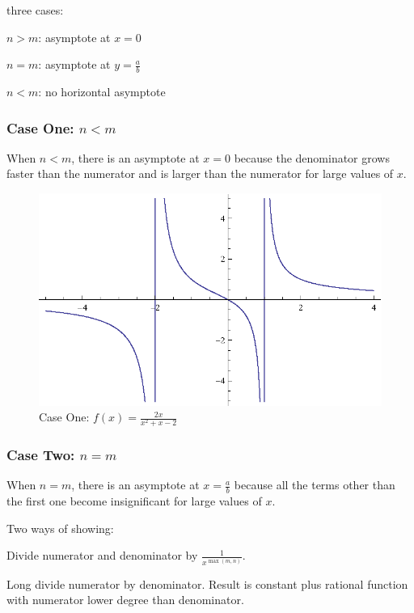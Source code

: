 \documentclass{exam}
\begin{document}
  three cases:
  \begin{enumerate*}
    \item $n > m$: asymptote at $x = 0$
    \item $n = m$: asymptote at $y = \frac{a}{b}$
    \item $n < m$: no horizontal asymptote
  \end{enumerate*}

  \pagebreak

  \subsubsection{Case One: $n < m$}

  When $n < m$, there is an asymptote at $x = 0$ because the denominator grows faster than the numerator and is larger
  than the numerator for large values of $x$. 

  \begin{figure}[H]
    \centering
    \includegraphics[scale=1.0]{figure3.eps}
    \caption*{Case One: $f(x) = \frac{2 x}{x^2 + x - 2}$}
  \end{figure}

  \subsubsection{Case Two: $n = m$}

  When $n = m$, there is an asymptote at $x = \frac{a}{b}$ because all the terms other than the first one 
  become insignificant for large values of $x$.

  Two ways of showing:
  \begin{itemize*}
    \item Divide numerator and denominator by $\frac{1}{x^{\max(m, n)}}$.
    \item Long divide numerator by denominator.  Result is constant plus
      rational function with numerator lower degree than denominator.
  \end{itemize*}
\end{document}
